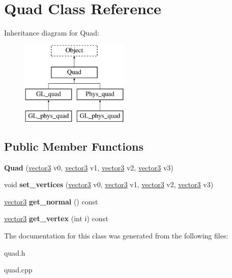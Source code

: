 \hypertarget{class_quad}{
\section{Quad Class Reference}
\label{class_quad}
}
Inheritance diagram for Quad:\begin{figure}[H]
\begin{center}
\leavevmode
\includegraphics[height=4.000000cm]{class_quad}
\end{center}
\end{figure}
\subsection*{Public Member Functions}
\begin{DoxyCompactItemize}
\item 
\hypertarget{class_quad_ae288d2687583e4e571ab6f6d48f07df7}{
{\bfseries Quad} (\hyperlink{classvector3d}{vector3} v0, \hyperlink{classvector3d}{vector3} v1, \hyperlink{classvector3d}{vector3} v2, \hyperlink{classvector3d}{vector3} v3)}
\label{class_quad_ae288d2687583e4e571ab6f6d48f07df7}

\item 
\hypertarget{class_quad_a4e98dd2e629921e4f1645fd8a5b0e8bd}{
void {\bfseries set\_\-vertices} (\hyperlink{classvector3d}{vector3} v0, \hyperlink{classvector3d}{vector3} v1, \hyperlink{classvector3d}{vector3} v2, \hyperlink{classvector3d}{vector3} v3)}
\label{class_quad_a4e98dd2e629921e4f1645fd8a5b0e8bd}

\item 
\hypertarget{class_quad_a1c3cb923fc9edea566e1426dd3b935b1}{
\hyperlink{classvector3d}{vector3} {\bfseries get\_\-normal} () const }
\label{class_quad_a1c3cb923fc9edea566e1426dd3b935b1}

\item 
\hypertarget{class_quad_a8b3b9b6accb93c9fce0819580e7fb5ea}{
\hyperlink{classvector3d}{vector3} {\bfseries get\_\-vertex} (int i) const }
\label{class_quad_a8b3b9b6accb93c9fce0819580e7fb5ea}

\end{DoxyCompactItemize}


The documentation for this class was generated from the following files:\begin{DoxyCompactItemize}
\item 
quad.h\item 
quad.cpp\end{DoxyCompactItemize}
